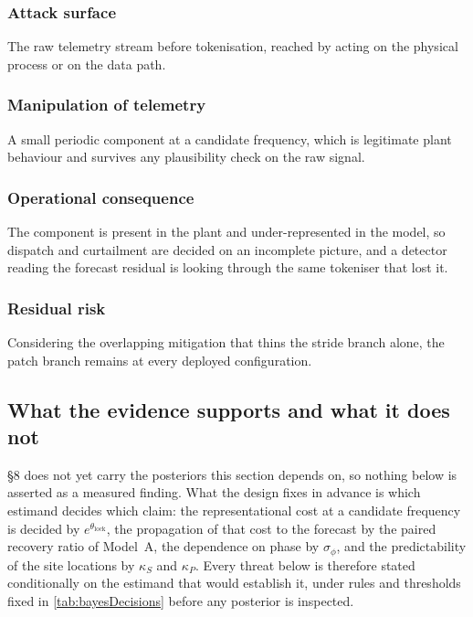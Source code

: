 \subsubsection{Attack surface}

The raw telemetry stream before tokenisation, reached by acting on the physical process or on the data path.

\subsubsection{Manipulation of telemetry}

A small periodic component at a candidate frequency, which is legitimate plant behaviour and survives any plausibility check on the raw signal.

\subsubsection{Operational consequence}

The component is present in the plant and under-represented in the model, so dispatch and curtailment are decided on an incomplete picture, and a detector reading the forecast residual is looking through the same tokeniser that lost it.

\subsubsection{Residual risk}

Considering the overlapping mitigation that thins the stride branch alone, the patch branch remains at every deployed configuration.



\subsection{What the evidence supports and what it does not}

\S8 does not yet carry the posteriors this section depends on, so nothing below is asserted as a measured finding. What the design fixes in advance is which estimand decides which claim: the representational cost at a candidate frequency is decided by $e^{\theta_{\mathrm{lock}}}$, the propagation of that cost to the forecast by the paired recovery ratio of Model~A, the dependence on phase by $\sigma_\phi$, and the predictability of the site locations by $\kappa_S$ and $\kappa_P$. Every threat below is therefore stated conditionally on the estimand that would establish it, under rules and thresholds fixed in \autoref{tab:bayesDecisions} before any posterior is inspected.

